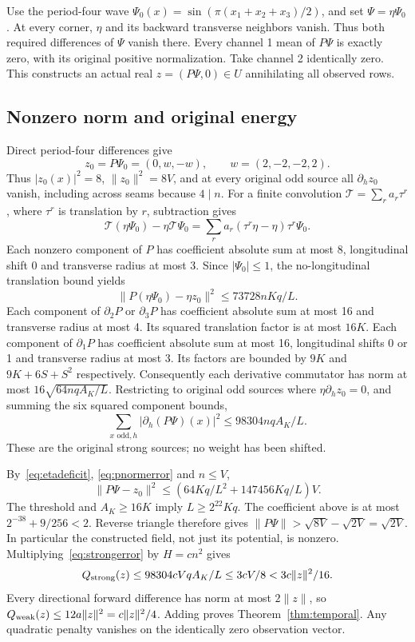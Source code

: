 \documentclass[11pt,a4paper]{article}
\newcommand{\norm}[1]{\lVert#1\rVert}
\begin{document}
Use the period-four wave
$\Psi_0(x)=\sin(\pi(x_1+x_2+x_3)/2)$, and set
$\Psi=\eta\Psi_0$. At every corner, $\eta$ and its backward transverse
neighbors vanish. Thus both required differences of $\Psi$ vanish there.
Every channel 1 mean of $P\Psi$ is exactly zero, with its original positive
normalization. Take channel 2 identically zero. This constructs an actual
real $z=(P\Psi,0)\in U$ annihilating all observed rows.

\subsection{Nonzero norm and original energy}
Direct period-four differences give
\[z_0=P\Psi_0=(0,w,-w),\qquad w=(2,-2,-2,2).\]
Thus $|z_0(x)|^2=8$,
$\norm{z_0}^2=8V$, and at every original odd source all $\partial_hz_0$
vanish, including across seams because $4\mid n$.
For a finite convolution $\mathcal T=\sum_r a_r\tau^r$, where $\tau^r$
is translation by $r$, subtraction gives
\[
 \mathcal T(\eta\Psi_0)-\eta\mathcal T\Psi_0
 =\sum_r a_r(\tau^r\eta-\eta)\tau^r\Psi_0.
\]
Each nonzero component of $P$ has coefficient absolute sum at most 8,
longitudinal shift 0 and transverse radius at most 3. Since $|\Psi_0|\leq1$,
the no-longitudinal translation bound yields
\begin{equation}\label{eq:pnormerror}
 \norm{P(\eta\Psi_0)-\eta z_0}^2\leq73728nKq/L.
\end{equation}
Each component of $\partial_2P$ or $\partial_3P$ has coefficient absolute
sum at most 16 and transverse radius at most 4. Its squared translation
factor is at most $16K$. Each component of $\partial_1P$ has coefficient
absolute sum at most 16, longitudinal shifts 0 or 1 and transverse radius
at most 3. Its factors are bounded by $9K$ and $9K+6S+S^2$ respectively.
Consequently each derivative commutator has norm at most
$16\sqrt{64nqA_K/L}$. Restricting to original odd sources where
$\eta\partial_hz_0=0$, and summing the six squared component bounds,
\begin{equation}\label{eq:strongerror}
 \sum_{x\text{ odd},h}|\partial_h(P\Psi)(x)|^2
 \leq98304nqA_K/L.
\end{equation}
These are the original strong sources; no weight has been shifted.

By~\eqref{eq:etadeficit}, \eqref{eq:pnormerror} and $n\leq V$,
\[
 \norm{P\Psi-z_0}^2\leq
 \left(64Kq/L^2+147456Kq/L\right)V.
\]
The threshold and $A_K\geq16K$ imply $L\geq2^{22}Kq$. The coefficient
above is at most $2^{-38}+9/256<2$. Reverse triangle therefore gives
$\norm{P\Psi}>\sqrt{8V}-\sqrt{2V}=\sqrt{2V}$.
In particular the constructed field, not just its potential, is nonzero.
Multiplying~\eqref{eq:strongerror} by $H=cn^2$ gives
\[
 Q_{\rm strong}(z)\leq98304cVqA_K/L
 \leq3cV/8<3c\norm z^2/16.
\]
Every directional forward difference has norm at most $2\norm z$, so
$Q_{\rm weak}(z)\leq12a\norm z^2=c\norm z^2/4$.
Adding proves Theorem~\ref{thm:temporal}. Any quadratic penalty vanishes
on the identically zero observation vector.
\end{document}
